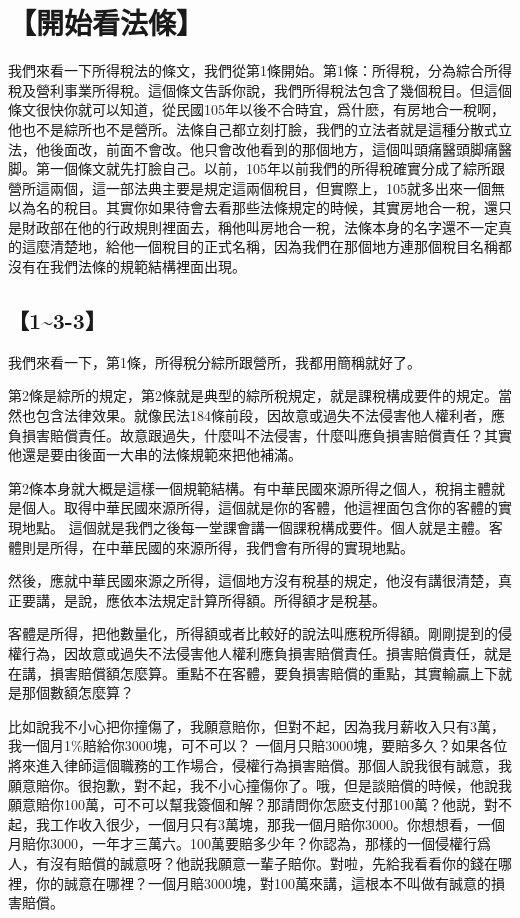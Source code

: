 \documentclass[]{ctexbook}
\begin{document}
\hypertarget{ux958bux59cbux770bux6cd5ux689d}{%
\section{【開始看法條】}\label{ux958bux59cbux770bux6cd5ux689d}}

我們來看一下所得稅法的條文，我們從第1條開始。第1條：所得稅，分為綜合所得稅及營利事業所得稅。這個條文告訴你說，我們所得稅法包含了幾個稅目。但這個條文很快你就可以知道，從民國105年以後不合時宜，爲什麽，有房地合一稅啊，他也不是綜所也不是營所。法條自己都立刻打臉，我們的立法者就是這種分散式立法，他後面改，前面不會改。他只會改他看到的那個地方，這個叫頭痛醫頭脚痛醫脚。第一個條文就先打臉自己。以前，105年以前我們的所得稅確實分成了綜所跟營所這兩個，這一部法典主要是規定這兩個稅目，但實際上，105就多出來一個無以為名的稅目。其實你如果待會去看那些法條規定的時候，其實房地合一稅，還只是財政部在他的行政規則裡面去，稱他叫房地合一稅，法條本身的名字還不一定真的這麼清楚地，給他一個稅目的正式名稱，因為我們在那個地方連那個稅目名稱都沒有在我們法條的規範結構裡面出現。

\hypertarget{section-3}{%
\subsection{【1\textasciitilde3-3】}\label{section-3}}

我們來看一下，第1條，所得稅分綜所跟營所，我都用簡稱就好了。

第2條是綜所的規定，第2條就是典型的綜所稅規定，就是課稅構成要件的規定。當然也包含法律效果。就像民法184條前段，因故意或過失不法侵害他人權利者，應負損害賠償責任。故意跟過失，什麼叫不法侵害，什麼叫應負損害賠償責任？其實他還是要由後面一大串的法條規範來把他補滿。

第2條本身就大概是這樣一個規範結構。有中華民國來源所得之個人，稅捐主體就是個人。取得中華民國來源所得，這個就是你的客體，他這裡面包含你的客體的實現地點。
這個就是我們之後每一堂課會講一個課稅構成要件。個人就是主體。客體則是所得，在中華民國的來源所得，我們會有所得的實現地點。

然後，應就中華民國來源之所得，這個地方沒有稅基的規定，他沒有講很清楚，真正要講，是說，應依本法規定計算所得額。所得額才是稅基。

客體是所得，把他數量化，所得額或者比較好的說法叫應稅所得額。剛剛提到的侵權行為，因故意或過失不法侵害他人權利應負損害賠償責任。損害賠償責任，就是在講，損害賠償額怎麼算。重點不在客體，要負損害賠償的重點，其實輸贏上下就是那個數額怎麼算？

比如說我不小心把你撞傷了，我願意賠你，但對不起，因為我月薪收入只有3萬，我一個月1\%賠給你3000塊，可不可以？ 一個月只賠3000塊，要賠多久？如果各位將來進入律師這個職務的工作場合，侵權行為損害賠償。那個人說我很有誠意，我願意賠你。很抱歉，對不起，我不小心撞傷你了。哦，但是談賠償的時候，他說我願意賠你100萬，可不可以幫我簽個和解？那請問你怎麽支付那100萬？他説，對不起，我工作收入很少，一個月只有3萬塊，那我一個月賠你3000。你想想看，一個月賠你3000，一年才三萬六。100萬要賠多少年？你認為，那樣的一個侵權行爲人，有沒有賠償的誠意呀？他説我願意一輩子賠你。對啦，先給我看看你的錢在哪裡，你的誠意在哪裡？一個月賠3000塊，對100萬來講，這根本不叫做有誠意的損害賠償。
\end{document}
